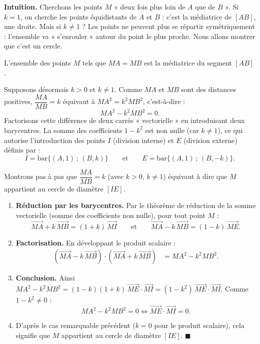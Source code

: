 \documentclass[11pt]{article}
\newcommand{\cle}[1]{{\popxbold\color{popdark}#1}}
\newcounter{popsec}
\newcounter{popsub}
\newcommand{\courssub}[1]{%
  \stepcounter{popsub}%
  \par\vspace{9pt}\noindent{\popxbold\fontsize{11.5}{13}\selectfont\color{popink}{\color{poporange}\thepopsec.\thepopsub}\hspace{6pt}#1}\par\nopagebreak\vspace{4pt}
}
\begin{document}
\courssub{Ligne de niveau $\dfrac{MA}{MB}=k$ ($k>0$)}

\textbf{Intuition.} Cherchons les points $M$ « deux fois plus loin de $A$ que de $B$ ». Si $k=1$, on cherche les points équidistants de $A$ et $B$ : c'est la médiatrice de $[AB]$, une droite. Mais si $k\neq 1$ ? Les points ne peuvent plus se répartir symétriquement : l'ensemble va « s'enrouler » autour du point le plus proche. Nous allons montrer que c'est un cercle.

\begin{propriete}[Cas $k=1$]
L'ensemble des points $M$ tels que $MA=MB$ est la \cle{médiatrice} du segment $[AB]$.
\end{propriete}

Supposons désormais $k>0$ et $k\neq 1$. Comme $MA$ et $MB$ sont des distances positives, $\dfrac{MA}{MB}=k$ équivaut à $MA^2=k^2MB^2$, c'est-à-dire :
\[
MA^2-k^2MB^2=0.
\]
Factorisons cette différence de deux carrés « vectorielle » en introduisant deux barycentres. La somme des coefficients $1-k^2$ est non nulle (car $k\neq 1$), ce qui autorise l'introduction des points $I$ (division interne) et $E$ (division externe) définis par :
\[
I=\mathrm{bar}\{(A,1)\,;\,(B,k)\} \qquad \text{et} \qquad E=\mathrm{bar}\{(A,1)\,;\,(B,-k)\}.
\]

\begin{experience}
Montrons pas à pas que $\dfrac{MA}{MB}=k$ (avec $k>0$, $k\neq 1$) équivaut à dire que $M$ appartient au cercle de diamètre $[IE]$.
\begin{enumerate}
\item \textbf{Réduction par les barycentres.} Par le théorème de réduction de la somme vectorielle (somme des coefficients non nulle), pour tout point $M$ :
\[
\overrightarrow{MA}+k\,\overrightarrow{MB}=(1+k)\,\overrightarrow{MI}
\qquad\text{et}\qquad
\overrightarrow{MA}-k\,\overrightarrow{MB}=(1-k)\,\overrightarrow{ME}.
\]
\item \textbf{Factorisation.} En développant le produit scalaire :
\begin{align*}
\left(\overrightarrow{MA}-k\,\overrightarrow{MB}\right)\cdot\left(\overrightarrow{MA}+k\,\overrightarrow{MB}\right)
&=MA^2-k^2MB^2.
\end{align*}
\item \textbf{Conclusion.} Ainsi $MA^2-k^2MB^2=(1-k)(1+k)\,\overrightarrow{ME}\cdot\overrightarrow{MI}=(1-k^2)\,\overrightarrow{ME}\cdot\overrightarrow{MI}$. Comme $1-k^2\neq 0$ :
\[
MA^2-k^2MB^2=0 \iff \overrightarrow{ME}\cdot\overrightarrow{MI}=0.
\]
\item D'après le cas remarquable précédent ($k=0$ pour le produit scalaire), cela signifie que $M$ appartient au \cle{cercle de diamètre $[IE]$}. $\blacksquare$
\end{enumerate}
\end{experience}
\end{document}
